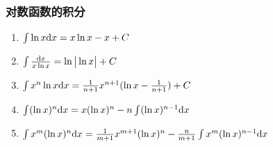 \begin{footnotesize}
\begin{enumerate}
\end{enumerate}

\subsubsection*{对数函数的积分}

\begin{enumerate}

\item $ \int \ln x \mathrm{d} x = x \ln x - x + C$

\item $ \int \frac{\mathrm{d} x}{x \ln x} =\ln \big | \ln x \big |+C $

\item $ \int x^n \ln x \mathrm{d} x = \frac{1}{n+1}x^{n+1}(\ln x - \frac{1}{n+1} ) +C $

\item $ \int (\ln x)^{n} \mathrm{d} x = x(\ln x)^ n - n \int (\ln x)^{n-1} \mathrm{d} x $

\item $ \int x ^ m(\ln x)^n \mathrm{d} x=\frac{1}{m+1}x^{m+1} (\ln x)^n - \frac{n}{m+1} \int x^m(\ln x)^{n-1}\mathrm{d} x $ 

\end{enumerate}

\end{footnotesize}